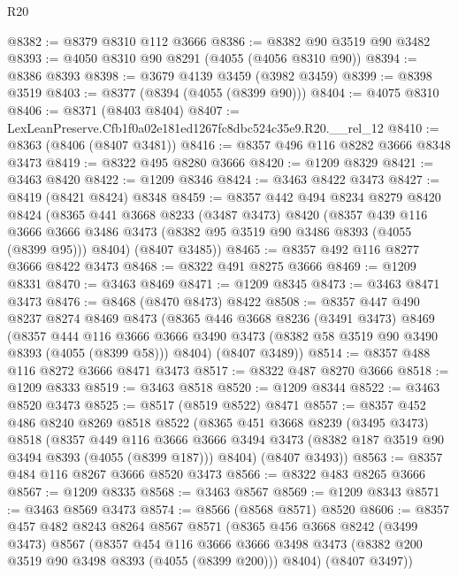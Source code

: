 \begin{lexlean}{R20}
\begin{coremodule}
@8382 := @8379 @8310 @112 @3666
@8386 := @8382 @90 @3519 @90 @3482
@8393 := @4050 @8310 @90 @8291 (@4055 (@4056 @8310 @90))
@8394 := @8386 @8393
@8398 := @3679 @4139 @3459 (@3982 @3459)
@8399 := @8398 @3519
@8403 := @8377 (@8394 (@4055 (@8399 @90)))
@8404 := @4075 @8310
@8406 := @8371 (@8403 @8404)
@8407 := LexLeanPreserve.Cfb1f0a02e181ed1267fc8dbc524c35e9.R20.__rel_12
@8410 := @8363 (@8406 (@8407 @3481))
@8416 := @8357 @496 @116 @8282 @3666 @8348 @3473
@8419 := @8322 @495 @8280 @3666
@8420 := @1209 @8329
@8421 := @3463 @8420
@8422 := @1209 @8346
@8424 := @3463 @8422 @3473
@8427 := @8419 (@8421 @8424) @8348
@8459 := @8357
    @442
    @494
    @8234
    @8279
    @8420
    @8424
    (@8365
      @441
      @3668
      @8233
      (@3487 @3473)
      @8420
      (@8357
        @439
        @116
        @3666
        @3666
        @3486
        @3473
        (@8382 @95 @3519 @90 @3486 @8393 (@4055 (@8399 @95)))
        @8404)
      (@8407 @3485))
@8465 := @8357 @492 @116 @8277 @3666 @8422 @3473
@8468 := @8322 @491 @8275 @3666
@8469 := @1209 @8331
@8470 := @3463 @8469
@8471 := @1209 @8345
@8473 := @3463 @8471 @3473
@8476 := @8468 (@8470 @8473) @8422
@8508 := @8357
    @447
    @490
    @8237
    @8274
    @8469
    @8473
    (@8365
      @446
      @3668
      @8236
      (@3491 @3473)
      @8469
      (@8357
        @444
        @116
        @3666
        @3666
        @3490
        @3473
        (@8382 @58 @3519 @90 @3490 @8393 (@4055 (@8399 @58)))
        @8404)
      (@8407 @3489))
@8514 := @8357 @488 @116 @8272 @3666 @8471 @3473
@8517 := @8322 @487 @8270 @3666
@8518 := @1209 @8333
@8519 := @3463 @8518
@8520 := @1209 @8344
@8522 := @3463 @8520 @3473
@8525 := @8517 (@8519 @8522) @8471
@8557 := @8357
    @452
    @486
    @8240
    @8269
    @8518
    @8522
    (@8365
      @451
      @3668
      @8239
      (@3495 @3473)
      @8518
      (@8357
        @449
        @116
        @3666
        @3666
        @3494
        @3473
        (@8382 @187 @3519 @90 @3494 @8393 (@4055 (@8399 @187)))
        @8404)
      (@8407 @3493))
@8563 := @8357 @484 @116 @8267 @3666 @8520 @3473
@8566 := @8322 @483 @8265 @3666
@8567 := @1209 @8335
@8568 := @3463 @8567
@8569 := @1209 @8343
@8571 := @3463 @8569 @3473
@8574 := @8566 (@8568 @8571) @8520
@8606 := @8357
    @457
    @482
    @8243
    @8264
    @8567
    @8571
    (@8365
      @456
      @3668
      @8242
      (@3499 @3473)
      @8567
      (@8357
        @454
        @116
        @3666
        @3666
        @3498
        @3473
        (@8382 @200 @3519 @90 @3498 @8393 (@4055 (@8399 @200)))
        @8404)
      (@8407 @3497))

\end{coremodule}
\end{lexlean}
